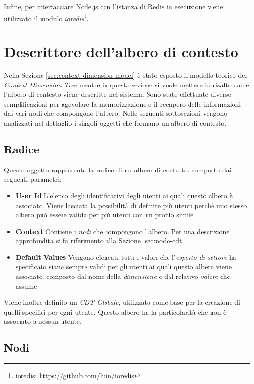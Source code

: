 Infine, per interfacciare Node.js con l'istanza di Redis in esecuzione viene utilizzato il modulo \emph{ioredis}\footnote{ioredis: \url{https://github.com/luin/ioredis}}.

\section{Descrittore dell'albero di contesto\label{sec:descrittore-albero-contesto}}

Nella Sezione \ref{sec:context-dimension-model} è stato esposto il modello teorico del \emph{Context Dimension Tree} mentre in questa sezione si vuole mettere in risalto come l'albero di contesto viene descritto nel sistema. Sono state effettuate diverse semplificazioni per agevolare la memorizzazione e il recupero delle informazioni dai vari nodi che compongono l'albero. Nelle seguenti sottosezioni vengono analizzati nel dettaglio i singoli oggetti che formano un albero di contesto.

\subsection{Radice\label{sec:radice-cdt}}

Questo oggetto rappresenta la radice di un albero di contesto. \upe composto dai seguenti parametri:

\begin{itemize}
	\item \textbf{User Id}
	L'elenco degli identificativi degli utenti ai quali questo albero è associato. Viene lasciata la possibilità di definire più utenti perché uno stesso albero può essere valido per più utenti con un profilo simile
	\item \textbf{Context}
	Contiene i \emph{nodi} che compongono l'albero. Per una descrizione approfondita si fa riferimento alla Sezione \ref{sec:nodo-cdt}
	\item \textbf{Default Values}
	Vengono elencati tutti i valori che l'\emph{esperto di settore} ha specificato siano sempre validi per gli utenti ai quali questo albero viene associato. \upe composto dal nome della \emph{dimensione} e dal relativo \emph{valore} che assume
\end{itemize}

Viene inoltre definito un \emph{CDT Globale}, utilizzato come base per la creazione di quelli specifici per ogni utente. Questo albero ha la particolarità che non è associato a nessun utente.

\subsection{Nodi\label{sec:nodo-cdt}}

